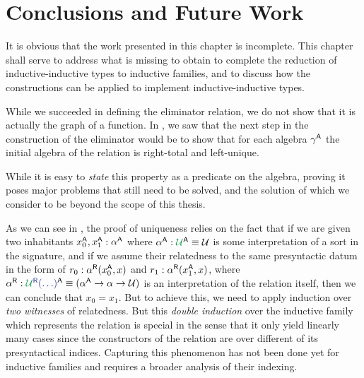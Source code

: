 \section{Conclusions and Future Work}

It is obvious that the work presented in this chapter is incomplete.
This chapter shall serve to address what is missing to obtain to complete
the reduction of inductive-inductive types to inductive families,
and to discuss how the constructions can be applied to implement inductive-inductive
types.

\begin{remark}
While we succeeded in defining the eliminator relation, we do not show that it
is actually the graph of a function.
In , we saw that the next step in the construction of the
eliminator would be to show that for each algebra $\gamma^{\mathsf{A}}$
the initial algebra of the relation
\tqm{\grm{\Gamma}^\RR(\blm{\IFcon{\grm{\Gamma}^\EE}}, \blm{\gamma^\CC})}
is right-total and left-unique.

While it is easy to \emph{state} this property as a predicate on the algebra,
proving it poses major problems that still need to be solved,
and the solution of which we consider to be beyond the scope of this thesis.

As we can see in , the proof of uniqueness
relies on the fact that if we are given two inhabitants $x^{\mathsf{A}}_0, x^{\mathsf{A}}_1 : \alpha^{\mathsf{A}}$
where $\alpha^\CC : \grm{\UU}^\CC \equiv \UU$ is some interpretation of a
sort in the signature, and if we assume their relatedness to the same presyntactic
datum in the form of $r_0 : \alpha^{\mathsf{R}}(x^{\mathsf{A}}_0, x)$ and $r_1 : \alpha^{\mathsf{R}}(x^{\mathsf{A}}_1, x)$,
where $\alpha^\RR : \tqm{\grm{\UU}^\RR(\ldots)}^\CC \equiv (\alpha^\CC \to \alpha \to \UU)$
is an interpretation of the relation itself,
then we can conclude that $x_0 = x_1$.
But to achieve this, we need to apply induction over \emph{two witnesses} of
relatedness.
But this \emph{double induction} over the inductive family which represents the
relation is special in the sense that it only yield linearly many cases
since the constructors of the relation are over different of its presyntactical
indices.
Capturing this phenomenon has not been done yet for inductive families and
requires a broader analysis of their indexing.


\end{remark}
